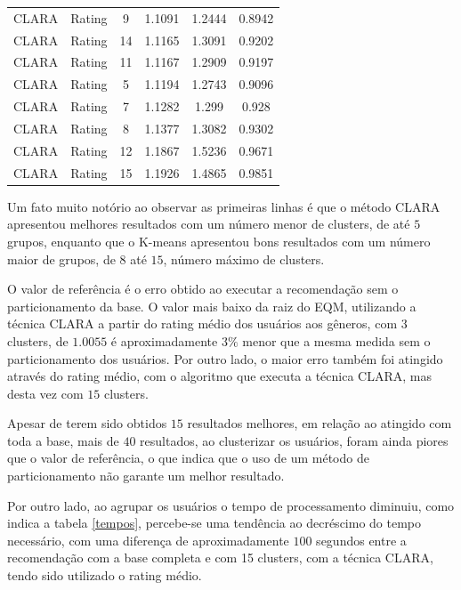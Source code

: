 \documentclass[12pt,a4paper,header]{abnt}
\begin{document}
\begin{longtable}{@{}llcccc@{}}
CLARA    & Rating                 & 9          & 1.1091          & 1.2444          & 0.8942          \\
CLARA    & Rating                 & 14         & 1.1165          & 1.3091          & 0.9202          \\
CLARA    & Rating                 & 11         & 1.1167          & 1.2909          & 0.9197          \\
CLARA    & Rating                 & 5          & 1.1194          & 1.2743          & 0.9096          \\
CLARA    & Rating                 & 7          & 1.1282          & 1.299           & 0.928           \\
CLARA    & Rating                 & 8          & 1.1377          & 1.3082          & 0.9302          \\
CLARA    & Rating                 & 12         & 1.1867          & 1.5236          & 0.9671          \\
CLARA    & Rating                 & 15         & 1.1926          & 1.4865          & 0.9851          \\* \bottomrule
\end{longtable}

Um fato muito notório ao observar as primeiras linhas é que o método CLARA apresentou melhores resultados com um número menor de clusters, de até $5$ grupos, enquanto que o K-means apresentou bons resultados com um número maior de grupos, de $8$ até $15$, número máximo de clusters.

O valor de referência é o erro obtido ao executar a recomendação sem o particionamento da base. O valor mais baixo da raiz do EQM, utilizando a técnica CLARA a partir do rating médio dos usuários aos gêneros, com 3 clusters, de $1.0055$ é aproximadamente $3\%$ menor que a mesma medida sem o particionamento dos usuários. Por outro lado, o maior erro também foi atingido através do rating médio, com o algoritmo que executa a técnica CLARA, mas desta vez com $15$ clusters. 

Apesar de terem sido obtidos $15$ resultados melhores, em relação ao atingido com toda a base, mais de $40$ resultados, ao clusterizar os usuários, foram ainda piores que o valor de referência, o que indica que o uso de um método de particionamento não garante um melhor resultado.

Por outro lado, ao agrupar os usuários o tempo de processamento diminuiu, como indica a tabela \ref{tempos}, percebe-se uma tendência ao decréscimo do tempo necessário, com uma diferença de aproximadamente $100$ segundos entre a recomendação com a base completa e com 15 clusters, com a técnica CLARA, tendo sido utilizado o rating médio.
\end{document}
